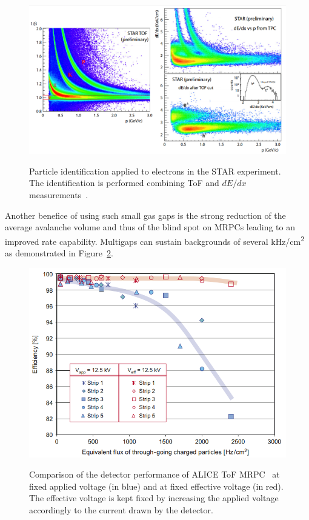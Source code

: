 	\begin{figure}[H]
		\centering
		\includegraphics[width = \plotwidth]{fig/chapt4/STAR-ToF.png}\\
		\caption{\label{fig:ParticleID} Particle identification applied to electrons in the STAR experiment. The identification is performed combining ToF and $dE/dx$ measurements~\cite{WILLIAMS2012}.}
	\end{figure}
	
	Another benefice of using such small gas gaps is the strong reduction of the average avalanche volume and thus of the blind spot on MRPCs leading to an improved rate capability. Multigaps can sustain backgrounds of several \si{kHz/cm^2} as demonstrated in Figure~\ref{fig:MRPCRate}.
	
	\begin{figure}[H]
		\centering
		\includegraphics[width = 0.7\plotwidth]{fig/chapt4/ALICE-Rate_Capability.png}\\
		\caption{\label{fig:MRPCRate} Comparison of the detector performance of ALICE ToF MRPC~\cite{ALICI2007} at fixed applied voltage (in blue) and at fixed effective voltage (in red). The effective voltage is kept fixed by increasing the applied voltage accordingly to the current drawn by the detector.}
	\end{figure}
	
